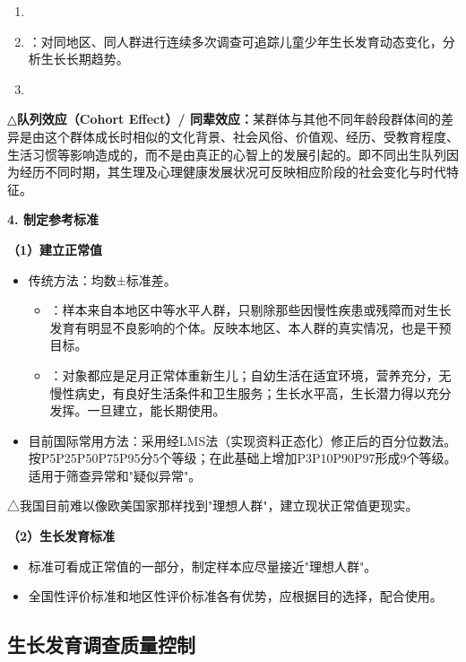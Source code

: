 \begin{defbox}
\begin{enumerate}[leftmargin=*]
    \item {}
    \item {}：对同地区、同人群进行连续多次调查可追踪儿童少年生长发育动态变化，分析生长长期趋势。
    \item {}
\end{enumerate}

△\textbf{队列效应（Cohort Effect）/ 同辈效应：}某群体与其他不同年龄段群体间的差异是由这个群体成长时相似的文化背景、社会风俗、价值观、经历、受教育程度、生活习惯等影响造成的，而不是由真正的心智上的发展引起的。即不同出生队列因为经历不同时期，其生理及心理健康发展状况可反映相应阶段的社会变化与时代特征。

\textbf{4. 制定参考标准}

\textbf{（1）建立正常值}

\begin{itemize}[leftmargin=*]
    \item 传统方法：均数±标准差。
    \begin{itemize}
        \item {}：样本来自本地区中等水平人群，只剔除那些因慢性疾患或残障而对生长发育有明显不良影响的个体。反映本地区、本人群的真实情况，也是干预目标。
        \item {}：对象都应是足月正常体重新生儿；自幼生活在适宜环境，营养充分，无慢性病史，有良好生活条件和卫生服务；生长水平高，生长潜力得以充分发挥。一旦建立，能长期使用。
    \end{itemize}
    \item 目前国际常用方法：采用经LMS法（实现资料正态化）修正后的百分位数法。按P5P25P50P75P95分5个等级；在此基础上增加P3P10P90P97形成9个等级。适用于筛查异常和"疑似异常"。
\end{itemize}

△我国目前难以像欧美国家那样找到"理想人群"，建立现状正常值更现实。

\textbf{（2）生长发育标准}

\begin{itemize}[leftmargin=*]
    \item 标准可看成正常值的一部分，制定样本应尽量接近"理想人群"。
    \item 全国性评价标准和地区性评价标准各有优势，应根据目的选择，配合使用。
\end{itemize}
\end{defbox}

\subsection{生长发育调查质量控制}

